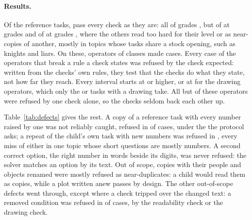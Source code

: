 \paragraph{Results.} Of the  reference tasks,  pass every check as they are: all  of grades , but  of  at grades  and  of  at grades , where the others read too hard for their level or as near-copies of another, mostly in topics whose tasks share a stock opening, such as knights and liars. On these,  operators of  classes made  cases. Every case of the  operators that break a rule a check states was refused by the check expected: written from the checks' own rules, they test that the checks do what they state, not how far they reach. Every \pct{} interval starts at \pct{} or higher, or at \pct{} for the drawing operators, which only the  or  tasks with a drawing take. All but  of these operators were refused by one check alone, so the checks seldom back each other up.

Table~\ref{tab:defects} gives the rest. A copy of a reference task with every number raised by one was not reliably caught, refused in \pct{} of cases, under the \pct{} the protocol asks; a repeat of the child's own task with new numbers was refused in \pct{}, every miss of either in one topic whose short questions are mostly numbers. A second correct option, the right number in words beside its digits, was never refused: the solver matches an option by its text. Out of scope, copies with their people and objects renamed were mostly refused as near-duplicates: a child would read them as copies, while a plot written anew passes by design. The other out-of-scope defects went through, except where a check tripped over the changed text: a removed condition was refused in \pct{} of cases, by the readability check or the drawing check.

